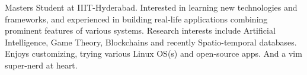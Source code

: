 


\begin{cvparagraph}

    Masters Student at IIIT-Hyderabad.
    Interested in learning new technologies and frameworks, and experienced in building real-life applications combining prominent features of various systems.
    Research interests include Artificial Intelligence, Game Theory, Blockchains and recently Spatio-temporal databases.
    Enjoys customizing, trying various Linux OS(s) and open-source apps. And a vim super-nerd at heart.
\end{cvparagraph}
